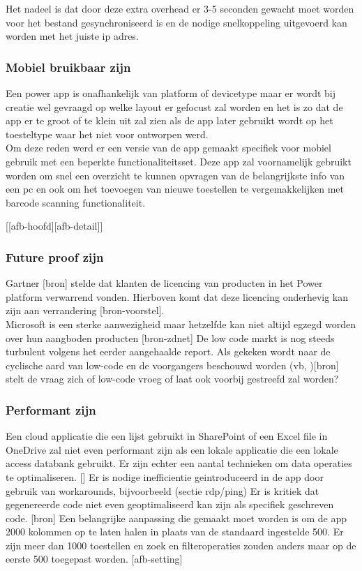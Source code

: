 Het nadeel is dat door deze extra overhead er 3-5 seconden gewacht moet worden voor het bestand gesynchroniseerd is en de nodige snelkoppeling uitgevoerd kan worden met het juiste ip adres.

\subsubsection{Mobiel bruikbaar zijn}

Een power app is onafhankelijk van platform of devicetype maar er wordt bij creatie wel gevraagd op welke layout er gefocust zal worden en het is zo dat de app er te groot of te klein uit zal zien als de app later gebruikt wordt op het toesteltype waar het niet voor ontworpen werd.\\
Om deze reden werd er een versie van de app gemaakt specifiek voor mobiel gebruik met een beperkte functionaliteitsset. Deze app zal voornamelijk gebruikt worden om snel een overzicht te kunnen opvragen van de belangrijkste info van een pc en ook om het toevoegen van nieuwe toestellen te vergemakkelijken met barcode scanning functionaliteit.

[[afb-hoofd][afb-detail]]

\subsubsection{Future proof zijn}

Gartner [bron] stelde dat klanten de licencing van producten in het Power platform verwarrend vonden. Hierboven komt dat deze licencing onderhevig kan zijn aan verrandering [bron-voorstel].\\
Microsoft is een sterke aanwezigheid maar hetzelfde kan niet altijd egzegd worden over hun aangboden producten [bron-zdnet]
De low code markt is nog steeds turbulent volgens het eerder aangehaalde report.
Als gekeken wordt naar de cyclische aard van low-code en de voorgangers beschouwd worden (vb, )[bron] stelt de vraag zich of low-code vroeg of laat ook voorbij gestreefd zal worden?

\subsubsection{Performant zijn}

Een cloud applicatie die een lijst gebruikt in SharePoint of een Excel file in OneDrive zal niet even performant zijn als een lokale applicatie die een lokale access databank gebruikt. Er zijn echter een aantal technieken om data operaties te optimaliseren. []
Er is nodige inefficientie geintroduceerd in de app door gebruik van workarounds, bijvoorbeeld (sectie rdp/ping)
Er is kritiek dat gegenereerde code niet even geoptimaliseerd kan zijn als specifiek geschreven code. [bron]
Een belangrijke aanpassing die gemaakt moet worden is om de app 2000 kolommen op te laten halen in plaats van de standaard ingestelde 500. Er zijn meer dan 1000 toestellen en zoek en filteroperaties zouden anders maar op de eerste 500 toegepast worden. [afb-setting]

